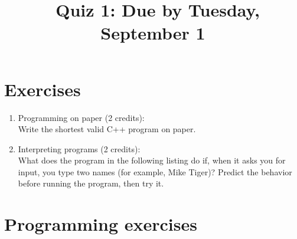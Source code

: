 \documentclass[11pt]{article}
\begin{document}
\title{\coursename~Quiz 1: Due by Tuesday, September 1}
\date{}
\maketitle

\medskip


\section*{Exercises}

\begin{enumerate}
\item Programming on paper (2 credits): \\
Write the shortest valid C++ program on paper.

\item Interpreting programs (2 credits): \\
What does the program in the following listing do if, when it asks you for input, you type two names (for example, Mike Tiger)? Predict the behavior before running the program, then try it.



\end{enumerate}

\section*{Programming exercises}
\end{document}
